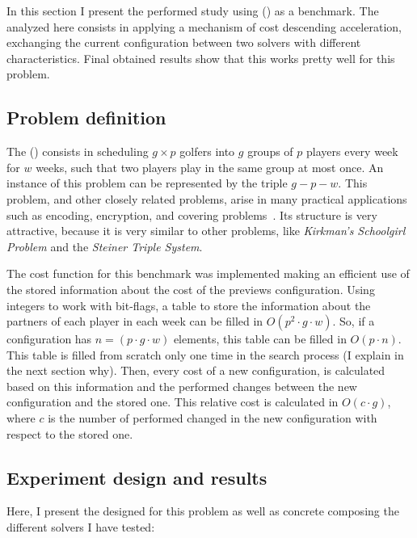 In this section I present the performed study using \sgp{} (\SGP) as a benchmark. The \commstr{} analyzed here consists in applying a mechanism of cost descending acceleration, exchanging the current configuration between two solvers with different characteristics. Final obtained results show that this \commstr{} works pretty well for this problem.

\subsection{Problem definition}

The \sgp{} (\SGP) consists in scheduling $g\times p$ golfers into $g$ groups of $p$ players every week for $w$ weeks, such that two players play in the same group at most once. An instance of this problem can be represented by the triple $g-p-w$. This problem, and other closely related problems, arise in many practical applications such as encoding, encryption, and covering problems~\cite{Lardeux2014}. Its structure is very attractive, because it is very similar to other problems, like \textit{Kirkman's Schoolgirl Problem} and the \textit{Steiner Triple System}. %

The cost function for this benchmark was implemented making an efficient use of the stored information about the cost of the previews configuration. Using integers to work with bit-flags, a table to store the information about the partners of each player in each week can be filled in $O\left(p^2\cdot g \cdot w\right)$. So, if a configuration has $n = (p\cdot g \cdot w)$ elements, this table can be filled in $O\left(p\cdot n\right)$. This table is filled from scratch only one time in the search process (I explain in the next section why). Then, every cost of a new configuration, is calculated based on this information and the performed changes between the new configuration and the stored one. This relative cost is calculated in $O\left(c\cdot g\right)$, where $c$ is the number of performed changed in the new configuration with respect to the stored one.

\subsection{Experiment design and results}

Here, I present the \as{} designed for this problem as well as concrete \oms{} composing the different solvers I have tested:

